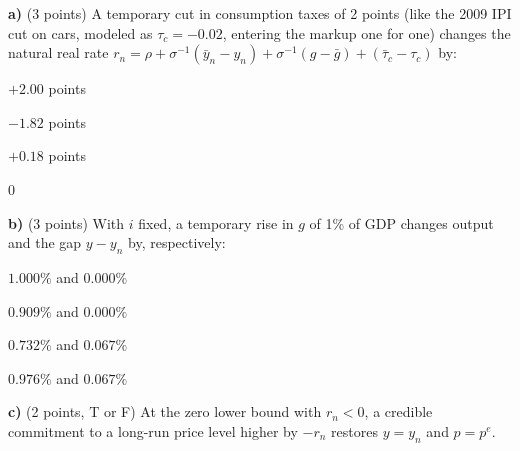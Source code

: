 \documentclass[11pt,a4paper]{article}
\begin{document}
\textbf{a)} (3 points) A temporary cut in consumption taxes of 2 points (like the 2009 IPI cut on cars,
modeled as $\tau_c=-0.02$, entering the markup one for one) changes the natural real rate
$r_n=\rho+\sigma^{-1}(\bar y_n-y_n)+\sigma^{-1}(g-\bar g)+(\bar\tau_c-\tau_c)$ by:
\begin{alternativas}
\item $+2.00$ points
\item $-1.82$ points
\item $+0.18$ points
\item $0$
\end{alternativas}
\begin{sol}
\end{sol}

\medskip
\textbf{b)} (3 points) With $i$ fixed, a temporary rise in $g$ of 1\% of GDP changes output and the gap
$y-y_n$ by, respectively:
\begin{alternativas}
\item $1.000\%$ and $0.000\%$
\item $0.909\%$ and $0.000\%$
\item $0.732\%$ and $0.067\%$
\item $0.976\%$ and $0.067\%$
\end{alternativas}
\begin{sol}
\end{sol}

\medskip
\textbf{c)} (2 points, T or F) At the zero lower bound with $r_n<0$, a credible commitment to a long-run
price level higher by $-r_n$ restores $y=y_n$ and $p=p^e$.
\begin{sol}
\end{sol}
\end{document}
